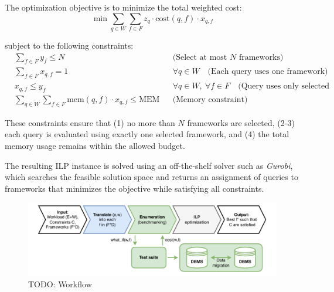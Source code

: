 The optimization objective is to minimize the total weighted cost:
$$\min \sum_{q \in W} \sum_{f \in F} z_q \cdot \text{cost}(q, f) \cdot x_{q,f}$$

\noindent
subject to the following constraints:
\begin{align*}
&\sum_{f \in F} y_f \leq N && \text{(Select at most $N$ frameworks)} \\
&\sum_{f \in F} x_{q,f} = 1 && \forall q \in W \quad \text{(Each query uses one framework)} \\
&x_{q,f} \leq y_f && \forall q \in W,\ \forall f \in F \quad \text{(Query uses only selected frameworks)} \\
&\sum_{q \in W} \sum_{f \in F} \text{mem}(q,f) \cdot x_{q,f} \leq \text{MEM} && \text{(Memory constraint)}
\end{align*}

These constraints ensure that (1) no more than $N$ frameworks are selected, (2-3) each query is evaluated using exactly one selected framework, and (4) the total memory usage remains within the allowed budget.

The resulting ILP instance is solved using an off-the-shelf solver such as \emph{Gurobi}, which searches the feasible solution space and returns an assignment of queries to frameworks that minimizes the objective while satisfying all constraints.

\begin{figure}
\centering
\includegraphics[scale=0.8]{thesis/img/thesis/ORM-workflow.pdf}
\caption{TODO: Workflow }
\label{fig:workflow}
\end{figure}


